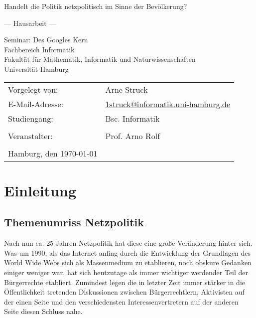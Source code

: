 \documentclass[
	12pt,
	a4paper,
	BCOR10mm,
	DIV14,
	listof=totoc,
	bibliography=totoc,
	headsepline
]{scrreprt}
\begin{document}
\begin{titlepage}
	\begin{center}
		{\titlefont\huge Handelt die Politik netzpolitisch im Sinne der Bevölkerung? \par}

		\bigskip
		\bigskip

		{\titlefont\Large --- Hausarbeit ---\par}

		\bigskip
		\bigskip

		{\large Seminar: Des Googles Kern\\
		Fachbereich Informatik\\
		Fakultät für Mathematik, Informatik und Naturwissenschaften\\
		Universität Hamburg\par}
	\end{center}

	\vfill

	{\large \begin{tabular}{ll}
		Vorgelegt von: & Arne Struck \\
		E-Mail-Adresse: 
			& \href{mailto:1struck@informatik.uni-hamburg.de}{1struck@informatik.uni-hamburg.de} \\ 
		Studiengang: & Bsc. Informatik \\
		\\
		Veranstalter: & Prof. Arno Rolf\\
		\\
		Hamburg, den \today
	\end{tabular}\par}
\end{titlepage}

\thispagestyle{empty}

\newpage\null\thispagestyle{empty}\newpage
\tableofcontents
\newpage\null\thispagestyle{empty}\newpage

\chapter{Einleitung}
\label{intro}

\section{Themenumriss Netzpolitik}
\label{themeintro}
Nach nun ca. 25 Jahren Netzpolitik hat diese eine große Veränderung hinter sich.
Was um 1990, als das Internet anfing durch die Entwicklung der Grundlagen des World Wide Webs sich als Massenmedium zu etablieren, noch obskure Gedanken einiger weniger war, hat sich heutzutage als immer wichtiger werdender Teil der Bürgerrechte etabliert.
Zumindest legen die in letzter Zeit immer stärker in die Öffentlichkeit tretenden Diskussionen zwischen Bürgerrechtlern, Aktivisten auf der einen Seite und den verschiedensten Interessenvertretern auf der anderen Seite diesen Schluss nahe. 
\end{document}
